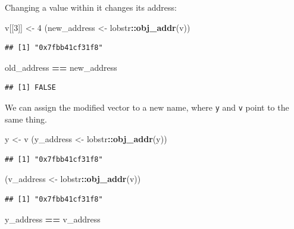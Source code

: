 \documentclass[]{book}
\newenvironment{Shaded}{\begin{snugshade}}{\end{snugshade}}
\newcommand{\DecValTok}[1]{\textcolor[rgb]{0.00,0.00,0.81}{#1}}
\newcommand{\KeywordTok}[1]{\textcolor[rgb]{0.13,0.29,0.53}{\textbf{#1}}}
\newcommand{\NormalTok}[1]{#1}
\newcommand{\OperatorTok}[1]{\textcolor[rgb]{0.81,0.36,0.00}{\textbf{#1}}}
\newcommand{\StringTok}[1]{\textcolor[rgb]{0.31,0.60,0.02}{#1}}
\begin{document}
Changing a value within it changes its address:

\begin{Shaded}
\begin{Highlighting}[]
\NormalTok{v[[}\DecValTok{3}\NormalTok{]] <-}\StringTok{ }\DecValTok{4}
\NormalTok{(new_address <-}\StringTok{ }\NormalTok{lobstr}\OperatorTok{::}\KeywordTok{obj_addr}\NormalTok{(v))}
\end{Highlighting}
\end{Shaded}

\begin{verbatim}
## [1] "0x7fbb41cf31f8"
\end{verbatim}

\begin{Shaded}
\begin{Highlighting}[]
\NormalTok{old_address }\OperatorTok{==}\StringTok{ }\NormalTok{new_address}
\end{Highlighting}
\end{Shaded}

\begin{verbatim}
## [1] FALSE
\end{verbatim}

We can assign the modified vector to a new name, where \texttt{y} and \texttt{v} point to the same thing.

\begin{Shaded}
\begin{Highlighting}[]
\NormalTok{y <-}\StringTok{ }\NormalTok{v}
\NormalTok{(y_address <-}\StringTok{ }\NormalTok{lobstr}\OperatorTok{::}\KeywordTok{obj_addr}\NormalTok{(y))}
\end{Highlighting}
\end{Shaded}

\begin{verbatim}
## [1] "0x7fbb41cf31f8"
\end{verbatim}

\begin{Shaded}
\begin{Highlighting}[]
\NormalTok{(v_address <-}\StringTok{ }\NormalTok{lobstr}\OperatorTok{::}\KeywordTok{obj_addr}\NormalTok{(v))}
\end{Highlighting}
\end{Shaded}

\begin{verbatim}
## [1] "0x7fbb41cf31f8"
\end{verbatim}

\begin{Shaded}
\begin{Highlighting}[]
\NormalTok{y_address }\OperatorTok{==}\StringTok{ }\NormalTok{v_address}
\end{Highlighting}
\end{Shaded}
\end{document}
